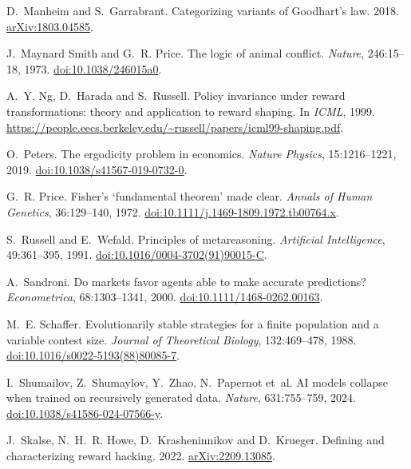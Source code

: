 \documentclass[11pt]{article}
\theoremstyle{definition}
\theoremstyle{remark}
\begin{document}
\begin{thebibliography}{}
D.~Manheim and S.~Garrabrant. Categorizing variants of Goodhart's law. 2018.
\href{https://arxiv.org/abs/1803.04585}{arXiv:1803.04585}.

J.~Maynard Smith and G.~R. Price. The logic of animal conflict. \emph{Nature}, 246:15--18, 1973.
\href{https://doi.org/10.1038/246015a0}{doi:10.1038/246015a0}.

A.~Y. Ng, D.~Harada and S.~Russell. Policy invariance under reward transformations: theory and
application to reward shaping. In \emph{ICML}, 1999.
\url{https://people.eecs.berkeley.edu/~russell/papers/icml99-shaping.pdf}.

O.~Peters. The ergodicity problem in economics. \emph{Nature Physics}, 15:1216--1221, 2019.
\href{https://doi.org/10.1038/s41567-019-0732-0}{doi:10.1038/s41567-019-0732-0}.

G.~R. Price. Fisher's `fundamental theorem' made clear. \emph{Annals of Human Genetics},
36:129--140, 1972. \href{https://doi.org/10.1111/j.1469-1809.1972.tb00764.x}{doi:10.1111/j.1469-1809.1972.tb00764.x}.

S.~Russell and E.~Wefald. Principles of metareasoning. \emph{Artificial Intelligence},
49:361--395, 1991.
\href{https://doi.org/10.1016/0004-3702(91)90015-C}{doi:10.1016/0004-3702(91)90015-C}.

A.~Sandroni. Do markets favor agents able to make accurate predictions? \emph{Econometrica},
68:1303--1341, 2000. \href{https://doi.org/10.1111/1468-0262.00163}{doi:10.1111/1468-0262.00163}.

M.~E. Schaffer. Evolutionarily stable strategies for a finite population and a variable contest
size. \emph{Journal of Theoretical Biology}, 132:469--478, 1988.
\href{https://doi.org/10.1016/s0022-5193(88)80085-7}{doi:10.1016/s0022-5193(88)80085-7}.

I.~Shumailov, Z.~Shumaylov, Y.~Zhao, N.~Papernot et~al. AI models collapse when trained on
recursively generated data. \emph{Nature}, 631:755--759, 2024.
\href{https://doi.org/10.1038/s41586-024-07566-y}{doi:10.1038/s41586-024-07566-y}.

J.~Skalse, N.~H.~R. Howe, D.~Krasheninnikov and D.~Krueger. Defining and characterizing reward
hacking. 2022. \href{https://arxiv.org/abs/2209.13085}{arXiv:2209.13085}.


\end{thebibliography}
\end{document}
